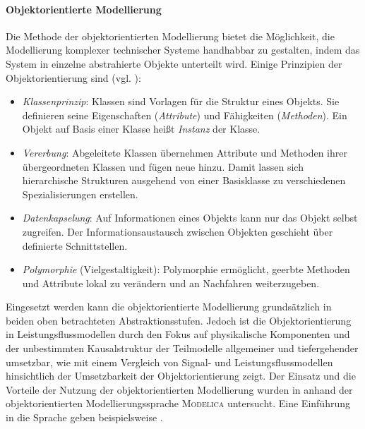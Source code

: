 \paragraph{Objektorientierte Modellierung} Die Methode der objektorientierten Modellierung bietet die Möglichkeit, die Modellierung komplexer technischer Systeme handhabbar zu gestalten, indem das System in einzelne abstrahierte Objekte unterteilt wird. Einige Prinzipien der Objektorientierung sind (vgl. \cite{notgesObjektorientierteModellierungSimulation2007}):\begin{itemize}
	\item \emph{Klassenprinzip}: Klassen sind Vorlagen für die Struktur eines Objekts. Sie definieren seine Eigenschaften (\emph{Attribute}) und Fähigkeiten (\emph{Methoden}). Ein Objekt auf Basis einer Klasse heißt \emph{Instanz} der Klasse.
	\item \emph{Vererbung}: Abgeleitete Klassen übernehmen Attribute und Methoden ihrer übergeordneten Klassen und fügen neue hinzu. Damit lassen sich hierarchische Strukturen ausgehend von einer Basisklasse zu verschiedenen Spezialisierungen erstellen.
	\item \emph{Datenkapselung}: Auf Informationen eines Objekts kann nur das Objekt selbst zugreifen. Der Informationsaustausch zwischen Objekten geschieht über definierte Schnittstellen.
	\item \emph{Polymorphie} (Vielgestaltigkeit): Polymorphie ermöglicht, geerbte Methoden und Attribute lokal zu verändern und an Nachfahren weiterzugeben.
\end{itemize}

Eingesetzt werden kann die objektorientierte Modellierung grundsätzlich in beiden oben betrachteten Abstraktionsstufen. Jedoch ist die Objektorientierung in Leistungsflussmodellen durch den Fokus auf physikalische Komponenten und der unbestimmten Kausalstruktur der Teilmodelle allgemeiner und tiefergehender umsetzbar, wie \cite[S.~1292-1327]{schroderElektrischeAntriebeRegelung2015} mit einem Vergleich von Signal- und Leistungsflussmodellen hinsichtlich der Umsetzbarkeit der Objektorientierung zeigt. Der Einsatz und die Vorteile der Nutzung der objektorientierten Modellierung wurden in \cites{gesenhuesObjektorientiertmodellbasierteCharakterisierungUberwachung2019,notgesObjektorientierteModellierungSimulation2007} anhand der objektorientierten Modellierungssprache \textsc{Modelica} untersucht. Eine Einführung in die Sprache geben beispielsweise \cites{kralModelicaObjektorientierteModellbildung2019,fritzsonIntroductionObjectOrientedModeling,tillerModelicaExample2014}.

